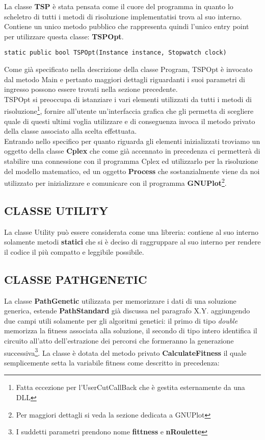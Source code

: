 \documentclass[11pt]{article}
\begin{document}
La classe \textbf{TSP} è stata pensata come il cuore del programma in quanto lo scheletro di tutti i metodi di risoluzione implementatisi trova al suo interno. Contiene un unico metodo pubblico che rappresenta quindi l'unico entry point per utilizzare questa classe: \textbf{TSPOpt}.

\begin{lstlisting}
static public bool TSPOpt(Instance instance, Stopwatch clock)
\end{lstlisting}

Come già specificato nella descrizione della classe Program, TSPOpt è invocato dal metodo Main e pertanto maggiori dettagli riguardanti i suoi parametri di ingresso possono essere trovati nella sezione precedente.\\
TSPOpt si preoccupa di istanziare i vari elementi utilizzati da tutti i metodi di risoluzione\footnote{Fatta eccezione per l'UserCutCallBack che è gestita esternamente da una DLL}, fornire all'utente un'interfaccia grafica che gli permetta di scegliere quale di questi ultimi voglia utilizzare e di conseguenza invoca il metodo privato della classe associato alla scelta effettuata.\\
Entrando nello specifico per quanto riguarda gli elementi inizializzati troviamo un oggetto della classe \textbf{Cplex} che come già accennato in precedenza ci permetterà di stabilire una connessione con il programma Cplex ed utilizzarlo per la risoluzione del modello matematico, ed un oggetto \textbf{Process} che sostanzialmente viene da noi utilizzato per inizializzare e comunicare con il programma \textbf{GNUPlot}\footnote{Per maggiori dettagli si veda la sezione dedicata a GNUPlot}.

\subsection*{CLASSE UTILITY}

La classe Utility può essere considerata come una libreria: contiene al suo interno solamente metodi \textbf{statici} che si è deciso di raggruppare al suo interno per rendere il codice il più compatto e leggibile possibile.

\subsection{CLASSE PATHGENETIC}

La classe \textbf{PathGenetic} utilizzata per memorizzare i dati di una soluzione generica, estende \textbf{PathStandard} già discussa nel paragrafo X.Y. aggiungendo due campi utili solamente per gli algoritmi genetici: il primo di tipo \textit{double} memorizza la fitness associata alla soluzione, il secondo di tipo intero identifica il circuito all'atto dell'estrazione dei percorsi che formeranno la generazione successiva\footnote{I suddetti parametri prendono nome \textbf{fittness} e \textbf{nRoulette}}.
La classe è dotata del metodo privato \textbf{CalculateFitness} il quale semplicemente setta la variabile fitness come descritto in precedenza:
\end{document}
